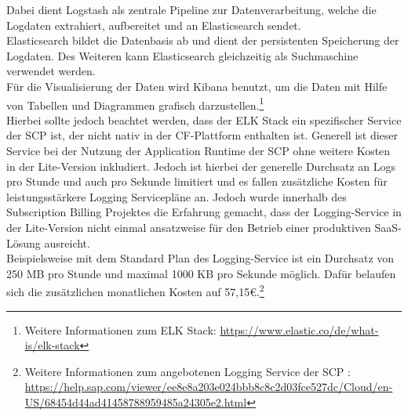 \begin{description}
	Dabei dient Logstash als zentrale Pipeline zur Datenverarbeitung, welche die Logdaten extrahiert, aufbereitet und an Elasticsearch sendet.\\
	Elasticsearch bildet die Datenbasis ab und dient der persistenten Speicherung der Logdaten. Des Weiteren kann Elasticsearch gleichzeitig als Suchmaschine verwendet werden.\\ 
	Für die Visualisierung der Daten wird Kibana benutzt, um die Daten mit Hilfe von Tabellen und Diagrammen grafisch darzustellen.\footnote{Weitere Informationen zum ELK Stack: \url{https://www.elastic.co/de/what-is/elk-stack}}
	\\
	Hierbei sollte jedoch beachtet werden, dass der ELK Stack ein spezifischer Service der \ac{SCP} ist, der nicht nativ in der \ac{CF}-Plattform enthalten ist. Generell ist dieser Service bei der Nutzung der Application Runtime der \ac{SCP} ohne weitere Kosten in der Lite-Version inkludiert. Jedoch ist hierbei der generelle Durchsatz an Logs pro Stunde und auch pro Sekunde limitiert und es fallen zusätzliche Kosten für leistungsstärkere Logging Servicepläne an. Jedoch wurde innerhalb des Subscription Billing Projektes die Erfahrung gemacht, dass der Logging-Service in der Lite-Version nicht einmal ansatzweise für den Betrieb einer produktiven \ac{SaaS}-Lösung ausreicht.\\
	Beispielsweise mit dem Standard Plan des Logging-Service ist ein Durchsatz von 250 \ac{MB} pro Stunde und maximal 1000 \ac{KB} pro Sekunde möglich. Dafür belaufen sich die zusätzlichen monatlichen Kosten auf 57,15\euro.\footnote{Weitere Informationen zum angebotenen Logging Service der \ac{SCP} : \url{https://help.sap.com/viewer/ee8e8a203e024bbb8c8c2d03fce527dc/Cloud/en-US/68454d44ad41458788959485a24305e2.html}} \\
\end{description}

